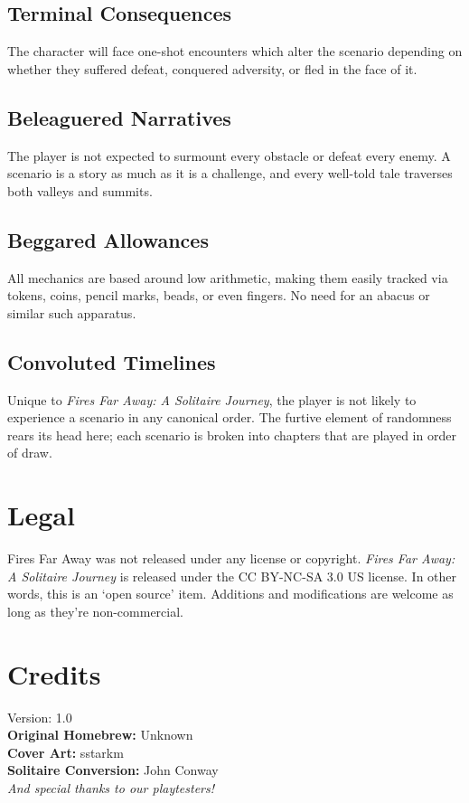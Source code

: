 \documentclass[12pt]{article}
\begin{document}
\begin{multicols*}{2}
\subsection*{Terminal Consequences}
The character will face one-shot encounters which alter the scenario depending on whether they suffered defeat, conquered adversity, or fled in the face of it.

\subsection*{Beleaguered Narratives}
The player is not expected to surmount every obstacle or defeat every enemy. A scenario is a story as much as it is a challenge, and every well-told tale traverses both valleys and summits.

\subsection*{Beggared Allowances}
All mechanics are based around low arithmetic, making them easily tracked via tokens, coins, pencil marks, beads, or even fingers. No need for an abacus or similar such apparatus.

\subsection*{Convoluted Timelines}
Unique to \emph{Fires Far Away: A Solitaire Journey}, the player is not likely to experience a scenario in any canonical order. The furtive element of randomness rears its head here; each scenario is broken into chapters that are played in order of draw.


\vfill

\section*{Legal}
Fires Far Away was not released under any license or copyright. \emph{Fires Far Away: A Solitaire Journey} is released under the CC BY-NC-SA 3.0 US license. In other words, this is an ‘open source’ item. Additions and modifications are welcome as long as they’re non-commercial.

\section*{Credits}
Version: 1.0\\
\textbf{Original Homebrew:} Unknown\\
\textbf{Cover Art:} sstarkm\\
\textbf{Solitaire Conversion:} John Conway\\
\emph{And special thanks to our playtesters!}


\end{multicols*}
\end{document}
